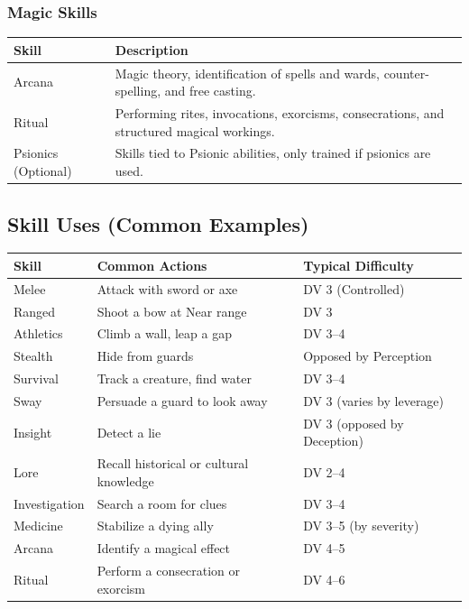 \subsubsection{Magic Skills}

\begin{tabular}{@{}lp{10cm}@{}}
\toprule
\textbf{Skill} & \textbf{Description} \\
\midrule
Arcana & Magic theory, identification of spells and wards, counter-spelling, and free casting. \\
Ritual & Performing rites, invocations, exorcisms, consecrations, and structured magical workings. \\
Psionics (Optional) & Skills tied to Psionic abilities, only trained if psionics are used. \\

\bottomrule
\end{tabular}

\subsection{Skill Uses (Common Examples)}

\begin{tabular}{@{}lll@{}}
\toprule
\textbf{Skill} & \textbf{Common Actions} & \textbf{Typical Difficulty} \\
\midrule
Melee & Attack with sword or axe & DV 3 (Controlled) \\
Ranged & Shoot a bow at Near range & DV 3 \\
Athletics & Climb a wall, leap a gap & DV 3--4 \\
Stealth & Hide from guards & Opposed by Perception \\
Survival & Track a creature, find water & DV 3--4 \\
Sway & Persuade a guard to look away & DV 3 (varies by leverage) \\
Insight & Detect a lie & DV 3 (opposed by Deception) \\
Lore & Recall historical or cultural knowledge & DV 2--4 \\
Investigation & Search a room for clues & DV 3--4 \\
Medicine & Stabilize a dying ally & DV 3--5 (by severity) \\
Arcana & Identify a magical effect & DV 4--5 \\
Ritual & Perform a consecration or exorcism & DV 4--6 \\
\bottomrule
\end{tabular}

